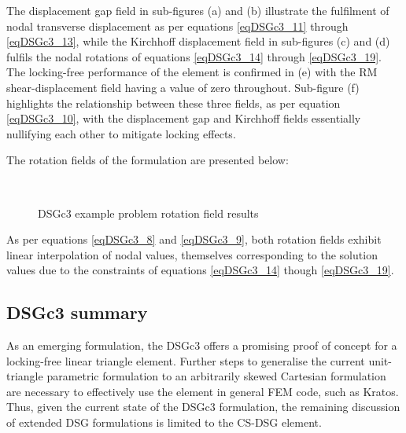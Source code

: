 The displacement gap field in sub-figures (a) and (b) illustrate the fulfilment of nodal transverse displacement as per equations \ref{eqDSGc3_11} through \ref{eqDSGc3_13}, while the Kirchhoff displacement field in sub-figures (c) and (d) fulfils the nodal rotations of equations \ref{eqDSGc3_14} through \ref{eqDSGc3_19}. The locking-free performance of the element is confirmed in (e) with the RM shear-displacement field having a value of zero throughout. Sub-figure (f) highlights the relationship between these three fields, as per equation \ref{eqDSGc3_10}, with the displacement gap and Kirchhoff fields essentially nullifying each other to mitigate locking effects.

The rotation fields of the formulation are presented below:

\begin{figure}[H]
	\\
	\caption{\label{csdsgc3_resul1t}DSGc3 example problem rotation field results}
\end{figure}

As per equations \ref{eqDSGc3_8} and \ref{eqDSGc3_9}, both rotation fields exhibit linear interpolation of nodal values, themselves corresponding to the solution values due to the constraints of equations \ref{eqDSGc3_14} though \ref{eqDSGc3_19}.

\subsection{DSGc3 summary}
As an emerging formulation, the DSGc3 offers a promising proof of concept for a locking-free linear triangle element. Further steps to generalise the current unit-triangle parametric formulation to an arbitrarily skewed Cartesian formulation are necessary to effectively use the element in general FEM code, such as Kratos. Thus, given the current state of the DSGc3 formulation, the remaining discussion of extended DSG formulations is limited to the CS-DSG element.

